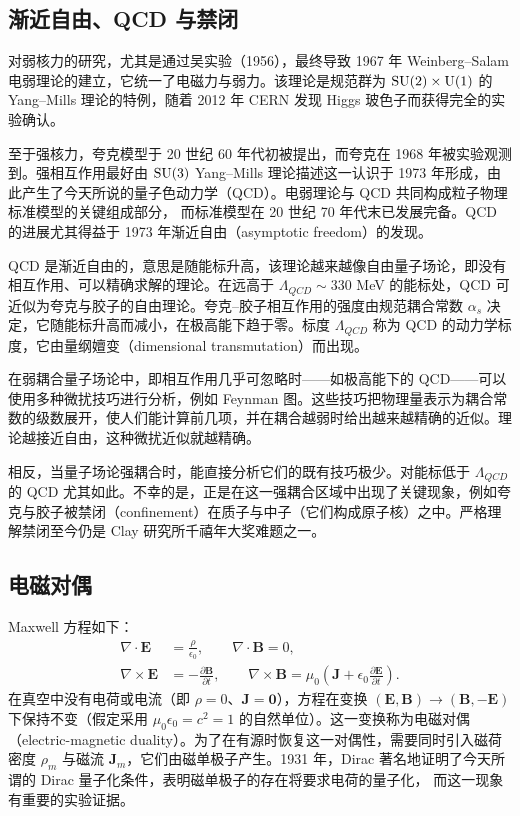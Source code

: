 \subsection*{渐近自由、QCD 与禁闭}

对弱核力的研究，尤其是通过吴实验（1956），最终导致 1967 年 Weinberg--Salam 电弱理论的建立，它统一了电磁力与弱力。该理论是规范群为 $\operatorname{SU}(2)\times\mathrm{U}(1)$ 的 Yang--Mills 理论的特例，随着 2012 年 CERN 发现 Higgs 玻色子而获得完全的实验确认。

至于强核力，夸克模型于 20 世纪 60 年代初被提出，而夸克在 1968 年被实验观测到。强相互作用最好由 $\operatorname{SU}(3)$ Yang--Mills 理论描述这一认识于 1973 年形成，由此产生了今天所说的量子色动力学（QCD）。电弱理论与 QCD 共同构成粒子物理标准模型的关键组成部分，
而标准模型在 20 世纪 70 年代末已发展完备。QCD 的进展尤其得益于 1973 年渐近自由（asymptotic freedom）的发现。

QCD 是渐近自由的，意思是随能标升高，该理论越来越像自由量子场论，即没有相互作用、可以精确求解的理论。在远高于 $\Lambda_{QCD}\sim 330$ MeV 的能标处，QCD 可近似为夸克与胶子的自由理论。夸克–胶子相互作用的强度由规范耦合常数 $\alpha_s$ 决定，它随能标升高而减小，在极高能下趋于零。标度 $\Lambda_{QCD}$ 称为 QCD 的动力学标度，它由量纲嬗变（dimensional transmutation）而出现。

在弱耦合量子场论中，即相互作用几乎可忽略时——如极高能下的 QCD——可以使用多种微扰技巧进行分析，例如 Feynman 图。这些技巧把物理量表示为耦合常数的级数展开，使人们能计算前几项，并在耦合越弱时给出越来越精确的近似。理论越接近自由，这种微扰近似就越精确。

相反，当量子场论强耦合时，能直接分析它们的既有技巧极少。对能标低于 $\Lambda_{QCD}$ 的 QCD 尤其如此。不幸的是，正是在这一强耦合区域中出现了关键现象，例如夸克与胶子被禁闭（confinement）在质子与中子（它们构成原子核）之中。严格理解禁闭至今仍是 Clay 研究所千禧年大奖难题之一。

\subsection*{电磁对偶}

Maxwell 方程如下：
\begin{align*}
\nabla\cdot\mathbf{E}&=\frac{\rho}{\epsilon_0},\qquad \nabla\cdot\mathbf{B}=0,\\
\nabla\times\mathbf{E}&=-\frac{\partial\mathbf{B}}{\partial t},\qquad
\nabla\times\mathbf{B}=\mu_0\left(\mathbf{J}+\epsilon_0\frac{\partial\mathbf{E}}{\partial t}\right).
\end{align*}
在真空中没有电荷或电流（即 $\rho=0$、$\mathbf{J}=\mathbf{0}$），方程在变换 $(\mathbf{E},\mathbf{B})\to(\mathbf{B},-\mathbf{E})$ 下保持不变（假定采用 $\mu_0\epsilon_0=c^2=1$ 的自然单位）。这一变换称为电磁对偶（electric-magnetic duality）。为了在有源时恢复这一对偶性，需要同时引入磁荷密度 $\rho_m$ 与磁流 $\mathbf{J}_m$，它们由磁单极子产生。1931 年，Dirac 著名地证明了今天所谓的 Dirac 量子化条件，表明磁单极子的存在将要求电荷的量子化，
而这一现象有重要的实验证据。

